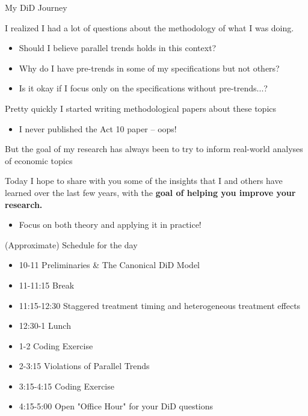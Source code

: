 \documentclass[aspectratio = 169, 12pt]{beamer}
\begin{document}
\begin{frame}{My DiD Journey}
  \begin{wideitemize}
    \item
    I realized I had a lot of questions about the methodology of what I was doing.
    \begin{itemize}
      \item
            Should I believe parallel trends holds in this context?

      \item
            Why do I have pre-trends in some of my specifications but not others?

      \item
            Is it okay if I focus only on the specifications without pre-trends...?
    \end{itemize}

    \pause
    \item Pretty quickly I started writing methodological papers about these topics
    \begin{itemize}
      \item
            I never published the Act 10 paper -- oops!
    \end{itemize}

    \item But the goal of my research has always been to try to inform real-world analyses of economic topics

    \pause
    \item Today I hope to share with you some of the insights that I and others have learned over the last few years, with the \textbf{goal of helping you improve your research.}
    \begin{itemize}
      \item
            Focus on both theory and applying it in practice!
    \end{itemize}

  \end{wideitemize}
\end{frame}


\begin{frame}{(Approximate) Schedule for the day}
\begin{itemize}
	\item 10-11 Preliminaries \& The Canonical DiD Model
	\item 11-11:15 Break
	\item 11:15-12:30 Staggered treatment timing and heterogeneous treatment effects
	\item 12:30-1 Lunch
	\item 1-2 Coding Exercise
	\item 2-3:15 Violations of Parallel Trends
	\item 3:15-4:15 Coding Exercise
	\item 4:15-5:00 Open "Office Hour" for your DiD questions
\end{itemize}
\end{frame}
\end{document}
